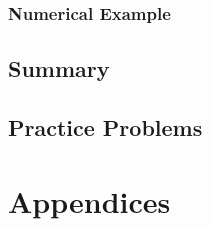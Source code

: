 \documentclass[oneside]{book}
\numberwithin{equation}{section}
\begin{document}
\subsubsection{Numerical Example}

\subsection{Summary}

\subsection{Practice Problems}


\section{Appendices}


\printbibliography[heading=bibintoc]
	
\end{document}
